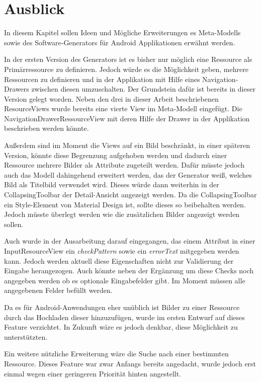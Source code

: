 \chapter{Ausblick}

In diesem Kapitel sollen Ideen und Mögliche Erweiterungen es Meta-Modells sowie des Software-Generators für Android Applikationen erwähnt werden.

In der ersten Version des Generators ist es bisher nur möglich eine Ressource als Primärressource zu definieren. Jedoch würde es die Möglichkeit geben, mehrere Ressourcen zu definieren und in der Applikation mit Hilfe eines Navigation-Drawers zwischen diesen umzuschalten. Der Grundstein dafür ist bereits in dieser Version gelegt worden. Neben den drei in dieser Arbeit beschriebenen ResourceViews wurde bereits eine vierte View im Meta-Modell eingefügt. Die NavigationDrawerRessourceView mit deren Hilfe der Drawer in der Applikation beschrieben werden könnte.

Außerdem sind im Moment die Views auf ein Bild beschränkt, in einer späteren Version,  könnte diese Begrenzung  aufgehoben werden und dadurch einer Ressource mehrere Bilder als Attribute zugeteilt werden. Dafür müsste jedoch auch das Modell dahingehend erweitert werden, das der Generator weiß, welches Bild als Titelbild verwendet wird. Dieses würde dann weiterhin in der CollapsingToolbar der Detail-Ansicht angezeigt werden. Da die CollapsingToolbar ein Style-Element von Material Design ist, sollte dieses so beibehalten werden. Jedoch müsste überlegt werden wie die zusätzlichen Bilder angezeigt werden sollen.

Auch wurde in der Ausarbeitung darauf eingegangen, das einem Attribut in einer InputResourceView ein \textit{checkPattern} sowie ein \textit{errorText} mitgegeben werden kann. Jedoch werden aktuell diese Eigenschaften nicht zur Validierung der Eingabe herangezogen. Auch könnte neben der Ergänzung um diese Checks noch angegeben werden ob es optionale Eingabefelder gibt. Im Moment müssen alle angegebenen Felder befüllt werden.

Da es für Android-Anwendungen eher unüblich ist Bilder zu einer Ressource durch das Hochladen dieser hinzuzufügen, wurde im ersten Entwurf auf dieses Feature verzichtet. In Zukunft wäre es jedoch denkbar, diese Möglichkeit zu unterstützten. 

Ein weitere nützliche Erweiterung wäre die Suche nach einer bestimmten Ressource. Dieses Feature war zwar Anfangs bereits angedacht, wurde jedoch erst einmal wegen einer geringeren Priorität hinten angestellt.
